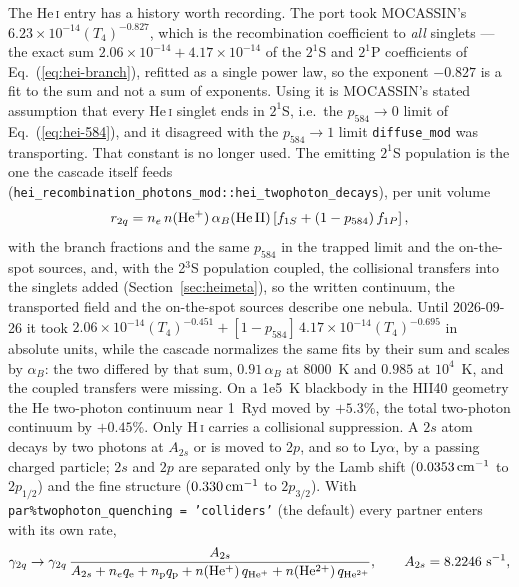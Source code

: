 \documentclass[english,a4paper]{my_memo}
\newcommand{\code}[1]{\texttt{#1}}
\begin{document}
The He\,\textsc{i} entry has a history worth recording.  The
port took MOCASSIN's $6.23{\times}10^{-14}(T_4)^{-0.827}$, which is the
recombination coefficient to \emph{all} singlets --- the exact sum
$2.06{\times}10^{-14}+4.17{\times}10^{-14}$ of the $2^1$S and $2^1$P
coefficients of Eq.~(\ref{eq:hei-branch}), refitted as a single power law, so
the exponent $-0.827$ is a fit to the sum and not a sum of exponents.  Using
it is MOCASSIN's stated assumption that every He\,\textsc{i} singlet ends in
$2^1$S, i.e.\ the $p_{584}\rightarrow0$ limit of Eq.~(\ref{eq:hei-584}), and
it disagreed with the $p_{584}\rightarrow1$ limit \code{diffuse\_mod} was
transporting.  That constant is no longer used.  The emitting $2^1$S
population is the one the cascade itself feeds
(\code{hei\_recombination\_photons\_mod::hei\_twophoton\_decays}), per
unit volume
\begin{equation}
 r_{2q} = n_e\,n({\rm He^+})\,\alpha_B({\rm He\,II})
   \left[f_{1S} + \left(1-p_{584}\right) f_{1P}\right],
\end{equation}
with the branch fractions and the same $p_{584}$ in the trapped limit
and the on-the-spot sources, and, with the 2$^3$S population coupled, the
collisional transfers into the singlets added (Section~\ref{sec:heimeta}),
so the written continuum, the transported field and the on-the-spot sources
describe one nebula.  Until 2026-09-26 it took
$2.06{\times}10^{-14}(T_4)^{-0.451} + [1-p_{584}]\,4.17{\times}10^{-14}
(T_4)^{-0.695}$ in absolute units, while the cascade normalizes the same fits
by their sum and scales by $\alpha_B$: the two differed by that sum,
$0.91\,\alpha_B$ at 8000~K and $0.985$ at $10^4$~K, and the coupled
transfers were missing.  On a 1e5~K blackbody in the HII40 geometry the He
two-photon continuum near 1~Ryd moved by $+5.3\%$, the total two-photon
continuum by $+0.45\%$.  Only H\,\textsc{i} carries a collisional suppression.  A
$2s$ atom decays by two photons at $A_{2s}$ or is moved to $2p$, and so to
Ly$\alpha$, by a passing charged particle; $2s$ and $2p$ are separated only
by the Lamb shift ($0.0353\,{\rm cm^{-1}}$ to $2p_{1/2}$) and the fine
structure ($0.330\,{\rm cm^{-1}}$ to $2p_{3/2}$).  With
\code{par\%twophoton\_quenching = 'colliders'} (the default) every partner
enters with its own rate,
\begin{equation}
  \gamma_{2q} \rightarrow \gamma_{2q}\,\frac{A_{2s}}
    {A_{2s} + n_e q_{\rm e} + n_{\rm p} q_{\rm p} + n({\rm He^+})\,q_{\rm He^+}
     + n({\rm He^{2+}})\,q_{\rm He^{2+}}},
  \qquad A_{2s} = 8.2246\ {\rm s^{-1}},
\end{equation}
\end{document}
